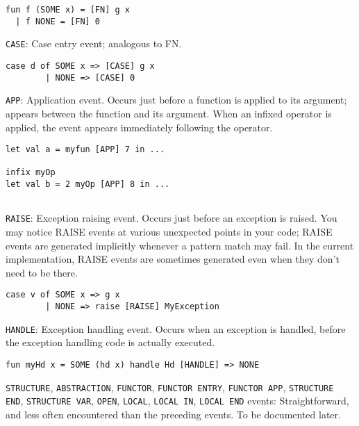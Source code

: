 \begin{verbatim}
fun f (SOME x) = [FN] g x
  | f NONE = [FN] 0
\end{verbatim}

\verb'CASE': Case entry event; analogous to FN.

\begin{verbatim}
case d of SOME x => [CASE] g x
        | NONE => [CASE] 0
\end{verbatim}

\verb'APP': Application event.  Occurs just before a function is applied to
its argument; appears between the function and its argument.  When an
infixed operator is applied, the event appears immediately following
the operator.

\begin{verbatim}
let val a = myfun [APP] 7 in ...

infix myOp
let val b = 2 myOp [APP] 8 in ...
       
\end{verbatim}

\verb'RAISE': Exception raising event.  Occurs just before an exception is
raised.  You may notice RAISE events at various unexpected points in
your code; RAISE events are generated implicitly whenever a pattern
match may fail.  In the current implementation, RAISE events are
sometimes generated even when they don't need to be there.

\begin{verbatim}
case v of SOME x => g x
        | NONE => raise [RAISE] MyException
\end{verbatim}

\verb'HANDLE': Exception handling event.  Occurs when an exception is
handled, before the exception handling code is actually executed.

\begin{verbatim}
fun myHd x = SOME (hd x) handle Hd [HANDLE] => NONE
\end{verbatim}

\verb'STRUCTURE', \verb'ABSTRACTION', \verb'FUNCTOR',
\verb'FUNCTOR ENTRY',
\verb'FUNCTOR APP', \verb'STRUCTURE END', \verb'STRUCTURE VAR',
\verb'OPEN', \verb'LOCAL', \verb'LOCAL IN', \verb'LOCAL END' events:
Straightforward, and less often encountered than the preceding events.
To be documented later.


